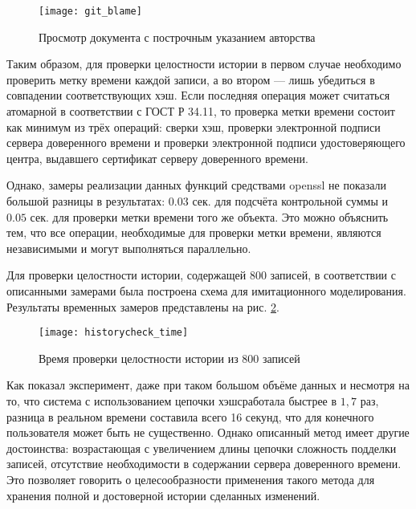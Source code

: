 \begin{figure}[h!]
  \centering
  \texttt{[image: git\_blame]}
  \caption{Просмотр документа с построчным указанием авторства}
  \label{img:git_blame}
\end{figure}

\vspace{\baselineskip}
Таким образом, для проверки целостности истории в первом случае необходимо проверить метку времени каждой записи, а во втором --- лишь убедиться в совпадении соответствующих хэш. Если последняя операция может считаться атомарной в соответствии с ГОСТ Р 34.11, то проверка метки времени состоит как минимум из трёх операций: сверки хэш, проверки электронной подписи сервера доверенного времени и проверки электронной подписи удостоверяющего центра, выдавшего сертификат серверу доверенного времени.

\vspace{\baselineskip}
Однако, замеры реализации данных функций средствами openssl не показали большой разницы в результатах: $0.03$ сек. для подсчёта контрольной суммы и $0.05$ сек. для проверки метки времени того же объекта. Это можно объяснить тем, что все операции, необходимые для проверки метки времени, являются независимыми и могут выполняться параллельно.

\vspace{\baselineskip}
Для проверки целостности истории, содержащей 800 записей, в соответствии с описанными замерами была построена схема для имитационного моделирования. Результаты временных замеров представлены на рис. \ref{img:historycheck_time}.

\begin{figure}[h!]
  \centering
  \texttt{[image: historycheck\_time]}
  \caption{Время проверки целостности истории из 800 записей}
  \label{img:historycheck_time}
\end{figure}

\vspace{\baselineskip}
Как показал эксперимент, даже при таком большом объёме данных и несмотря на то, что система с использованием цепочки хэш сработала быстрее в $1,7$ раз, разница в реальном времени составила всего 16 секунд, что для конечного пользователя может быть не существенно. Однако описанный метод имеет другие достоинства: возрастающая с увеличением длины цепочки сложность подделки записей, отсутствие необходимости в содержании сервера доверенного времени. Это позволяет говорить о целесообразности применения такого метода для хранения полной и достоверной истории сделанных изменений.
\FloatBarrier